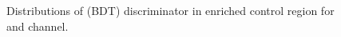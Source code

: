 \begin{figure}[htbp!]
  \caption{Distributions of \mcol (BDT) discriminator in \ttbar enriched control region for \Hmue and \Hemu channel.}
  \label{fig:tt_control}
\end{figure}

%
